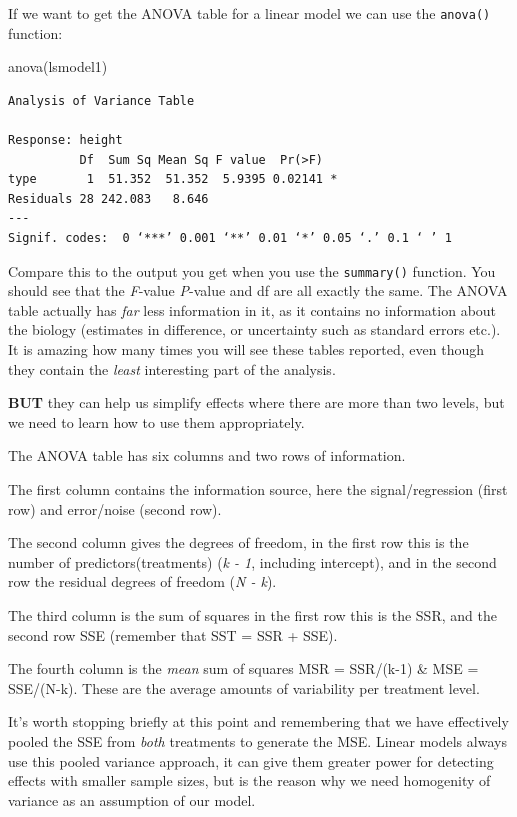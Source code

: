 \documentclass[
]{book}
\newenvironment{Shaded}{\begin{snugshade}}{\end{snugshade}}
\newcommand{\FunctionTok}[1]{\textcolor[rgb]{0.00,0.00,0.00}{#1}}
\newcommand{\NormalTok}[1]{#1}
\begin{document}
If we want to get the ANOVA table for a linear model we can use the \texttt{anova()} function:

\begin{Shaded}
\begin{Highlighting}[]
\FunctionTok{anova}\NormalTok{(lsmodel1)}
\end{Highlighting}
\end{Shaded}

\begin{verbatim}
Analysis of Variance Table

Response: height
          Df  Sum Sq Mean Sq F value  Pr(>F)  
type       1  51.352  51.352  5.9395 0.02141 *
Residuals 28 242.083   8.646                  
---
Signif. codes:  0 ‘***’ 0.001 ‘**’ 0.01 ‘*’ 0.05 ‘.’ 0.1 ‘ ’ 1
\end{verbatim}

Compare this to the output you get when you use the \texttt{summary()} function. You should see that the \emph{F}-value \emph{P}-value and df are all exactly the same. The ANOVA table actually has \emph{far} less information in it, as it contains no information about the biology (estimates in difference, or uncertainty such as standard errors etc.). It is amazing how many times you will see these tables reported, even though they contain the \emph{least} interesting part of the analysis.

\textbf{BUT} they can help us simplify effects where there are more than two levels, but we need to learn how to use them appropriately.

The ANOVA table has six columns and two rows of information.

The first column contains the information source, here the signal/regression (first row) and error/noise (second row).

The second column gives the degrees of freedom, in the first row this is the number of predictors(treatments) (\emph{k - 1}, including intercept), and in the second row the residual degrees of freedom (\emph{N - k}).

The third column is the sum of squares in the first row this is the SSR, and the second row SSE (remember that SST = SSR + SSE).

The fourth column is the \emph{mean} sum of squares MSR = SSR/(k-1) \& MSE = SSE/(N-k). These are the average amounts of variability per treatment level.

It's worth stopping briefly at this point and remembering that we have effectively pooled the SSE from \emph{both} treatments to generate the MSE. Linear models always use this pooled variance approach, it can give them greater power for detecting effects with smaller sample sizes, but is the reason why we need homogenity of variance as an assumption of our model.
\end{document}

